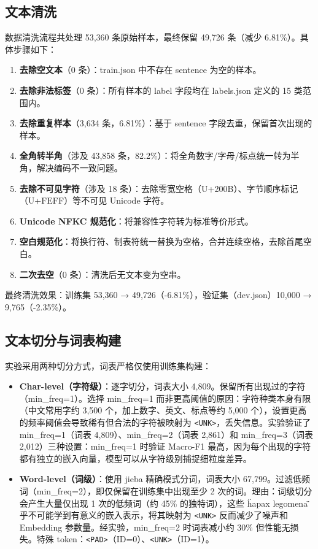 \subsection{文本清洗}

数据清洗流程共处理 53,360 条原始样本，最终保留 49,726 条（减少 6.81\%）。具体步骤如下：

\begin{enumerate}
\item \textbf{去除空文本}（0 条）：train.json 中不存在 sentence 为空的样本。
\item \textbf{去除非法标签}（0 条）：所有样本的 label 字段均在 labels.json 定义的 15 类范围内。
\item \textbf{去除重复样本}（3,634 条，6.81\%）：基于 sentence 字段去重，保留首次出现的样本。
\item \textbf{全角转半角}（涉及 43,858 条，82.2\%）：将全角数字/字母/标点统一转为半角，解决编码不一致问题。
\item \textbf{去除不可见字符}（涉及 18 条）：去除零宽空格（U+200B）、字节顺序标记（U+FEFF）等不可见 Unicode 字符。
\item \textbf{Unicode NFKC 规范化}：将兼容性字符转为标准等价形式。
\item \textbf{空白规范化}：将换行符、制表符统一替换为空格，合并连续空格，去除首尾空白。
\item \textbf{二次去空}（0 条）：清洗后无文本变为空串。
\end{enumerate}

最终清洗效果：训练集 53,360 → 49,726（-6.81\%），验证集（dev.json）10,000 → 9,765（-2.35\%）。

\subsection{文本切分与词表构建}

实验采用两种切分方式，词表严格仅使用训练集构建：

\begin{itemize}
\item \textbf{Char-level（字符级）}：逐字切分，词表大小 4,809。保留所有出现过的字符（min\_freq=1）。选择 min\_freq=1 而非更高阈值的原因：字符种类本身有限（中文常用字约 3,500 个，加上数字、英文、标点等约 5,000 个），设置更高的频率阈值会导致稀有但合法的字符被映射为 \texttt{<UNK>}，丢失信息。实验验证了 min\_freq=1（词表 4,809）、min\_freq=2（词表 2,861）和 min\_freq=3（词表 2,012）三种设置：min\_freq=1 时验证 Macro-F1 最高，因为每个出现的字符都有独立的嵌入向量，模型可以从字符级别捕捉细粒度差异。

\item \textbf{Word-level（词级）}：使用 jieba 精确模式分词，词表大小 67,799。过滤低频词（min\_freq=2），即仅保留在训练集中出现至少 2 次的词。理由：词级切分会产生大量仅出现 1 次的低频词（约 45\% 的独特词），这些 \"hapax legomena\" 几乎不可能学到有意义的嵌入表示，将其映射为 \texttt{<UNK>} 反而减少了噪声和 Embedding 参数量。经实验，min\_freq=2 时词表减小约 30\% 但性能无损失。特殊 token：\texttt{<PAD>}（ID=0）、\texttt{<UNK>}（ID=1）。
\end{itemize}

